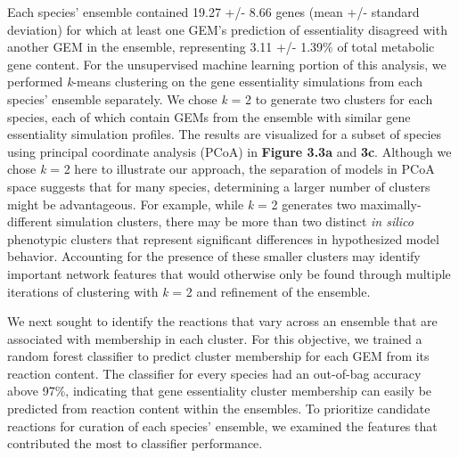 \documentclass[11pt,twocolumn,notitlepage,openany,twoside]{book}
\begin{document}
\begin{refsection}
Each species’ ensemble contained 19.27 +/- 8.66 genes (mean +/- standard deviation) for which at least one GEM’s prediction of essentiality disagreed with another GEM in the ensemble, representing 3.11 +/- 1.39\% of total metabolic gene content. For the unsupervised machine learning portion of this analysis, we performed \textit{k}-means clustering on the gene essentiality simulations from each species’ ensemble separately. We chose \textit{k} = 2 to generate two clusters for each species, each of which contain GEMs from the ensemble with similar gene essentiality simulation profiles. The results are visualized for a subset of species using principal coordinate analysis (PCoA) in \textbf{Figure 3.3a} and \textbf{3c}. Although we chose \textit{k} = 2 here to illustrate our approach, the separation of models in PCoA space suggests that for many species, determining a larger number of clusters might be advantageous. For example, while \textit{k} = 2 generates two maximally-different simulation clusters, there may be more than two distinct \textit{in silico} phenotypic clusters that represent significant differences in hypothesized model behavior. Accounting for the presence of these smaller clusters may identify important network features that would otherwise only be found through multiple iterations of clustering with \textit{k} = 2 and refinement of the ensemble.

We next sought to identify the reactions that vary across an ensemble that are associated with membership in each cluster. For this objective, we trained a random forest classifier \cite{Breiman2001-pl} to predict cluster membership for each GEM from its reaction content. The classifier for every species had an out-of-bag accuracy above 97\%, indicating that gene essentiality cluster membership can easily be predicted from reaction content within the ensembles. To prioritize candidate reactions for curation of each species’ ensemble, we examined the features that contributed the most to classifier performance.


\end{refsection}
\end{document}
